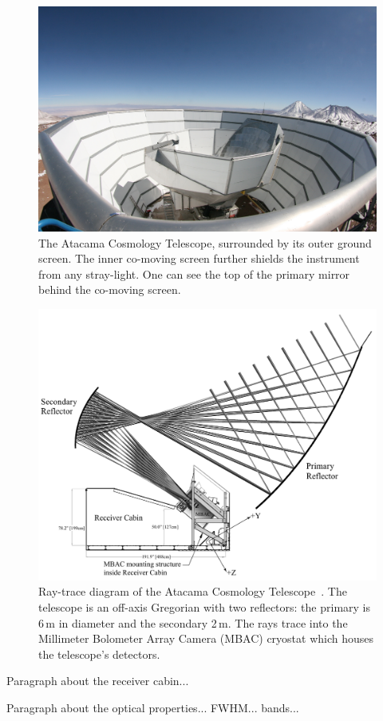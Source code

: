 \begin{figure}
    \centering
    \includegraphics[width = .7\textwidth]{Figures/act_inst_close.jpeg}
    \caption{The Atacama Cosmology Telescope, surrounded by its outer ground screen. The inner co-moving screen further shields the instrument from any stray-light.  One can see the top of the primary mirror behind the co-moving screen.}
    \label{fig:act_site}
\end{figure}

\begin{figure}[t]
    \centering
    \includegraphics[width = .8\textwidth]{Figures/act_inst.pdf}
    \caption{Ray-trace diagram of the Atacama Cosmology Telescope~\cite{act_inst}.  The telescope is an off-axis Gregorian with two reflectors: the primary is 6\,m in diameter and the secondary 2\,m.  The rays trace into the Millimeter Bolometer Array Camera (MBAC) cryostat which houses the telescope's detectors.}
    \label{fig:act_inst}
\end{figure}

Paragraph about the receiver cabin...

Paragraph about the optical properties... FWHM... bands... 

